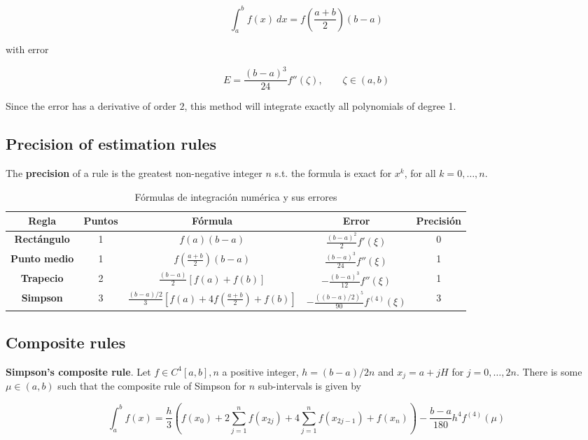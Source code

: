 \documentclass[12pt]{article}
\theoremstyle{definition}
\begin{document}
\begin{equation*}
    \int_a^b f(x) ~ dx = f\left( \frac{a+b}{2} \right) (b-a)
\end{equation*}

with error 

\begin{equation*}
    E = \frac{(b-a)^3}{24} f''(\zeta), \qquad \zeta \in (a, b)
\end{equation*}

Since the error has a derivative of order $2$, this method will integrate
exactly all polynomials of degree 1.

\subsection{Precision of estimation rules}

The \textbf{precision} of a rule is the greatest non-negative integer $n$ s.t. 
the formula is exact for $x^k$, for all $k = 0, \ldots, n$.

\begin{table}[h!]
\centering
\begin{tabular}{|>{\bfseries}c|c|c|c|c|}
\hline
Regla & Puntos & Fórmula & Error & Precisión \\
\hline
Rectángulo & 1 & $f(a)(b - a)$ & $\frac{(b - a)^2}{2} f'(\xi)$ & 0 \\
\hline
Punto medio & 1 & $f\left(\frac{a + b}{2}\right)(b - a)$ & $\frac{(b - a)^3}{24} f''(\xi)$ & 1 \\
\hline
Trapecio & 2 & $\frac{(b - a)}{2} [f(a) + f(b)]$ & $-\frac{(b - a)^3}{12} f''(\xi)$ & 1 \\
\hline
Simpson & 3 & $\frac{(b - a)/2}{3} \left[ f(a) + 4f\left(\frac{a + b}{2}\right) + f(b) \right]$ & $-\frac{((b - a)/2)^5}{90} f^{(4)}(\xi)$ & 3 \\
\hline
\end{tabular}
\caption{Fórmulas de integración numérica y sus errores}
\end{table}

\subsection{Composite rules}

\begin{shaded}
    \textbf{Simpson's composite rule}. Let $f \in C^4[a, b], n$ a positive
    integer, $h = (b-a) / 2n$ and $x_j = a + jH$ for $j = 0, \ldots, 2n$.
    There is some $\mu \in (a, b)$ such that the composite rule of Simpson for
    $n$ sub-intervals is given by 

    \begin{equation*}
        \int_a^b f(x) = \frac{h}{3}\left( f(x_0) + 2 \sum_{j=1}^n f(x_{2j}) + 4
        \sum_{j=1}^n f(x_{2j - 1}) + f(x_n)\right) - \frac{b-a}{180}h^4
        f^{(4)}(\mu)
    \end{equation*}
\end{shaded}
\end{document}
